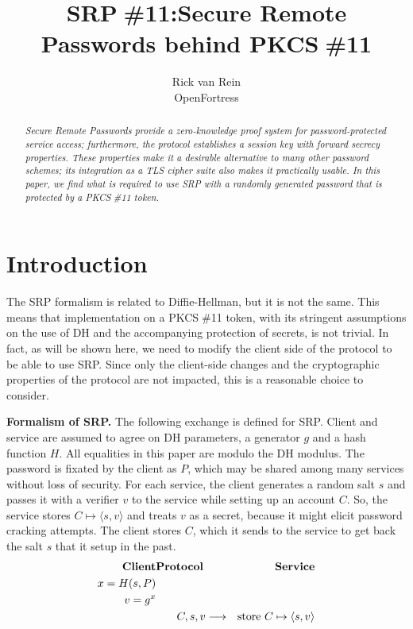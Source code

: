 \documentclass[a4paper,11pt]{article}
\def\pkcs11{PKCS$\;$\#11\xspace}
\def\srp11{SRP$\;$\#11\xspace}
\def\tor#1{\phantom{\longleftarrow\strut}#1\strut\longrightarrow}
\begin{document}
\title{\srp11:\break Secure Remote Passwords behind \pkcs11}
\author{Rick van Rein\\OpenFortress}
\maketitle

\begin{abstract}
\noindent\em Secure Remote Passwords provide a zero-knowledge proof system for password-protected service access; furthermore, the protocol establishes a session key with forward secrecy properties.  These properties make it a desirable alternative to many other password schemes; its integration as a TLS cipher suite also makes it practically usable.
In this paper, we find what is required to use SRP with a randomly generated password that is protected by a \pkcs11 token.
\end{abstract}

\section{Introduction}

The SRP formalism is related to Diffie-Hellman, but it is not the same.  This means that implementation on a \pkcs11 token, with its stringent assumptions on the use of DH and the accompanying protection of secrets, is not trivial.  In fact, as will be shown here, we need to modify the client side of the protocol to be able to use SRP.  Since only the client-side changes and the cryptographic properties of the protocol are not impacted, this is a reasonable choice to consider.

\textbf{Formalism of SRP.}
The following exchange is defined for SRP.  Client and service are assumed to agree on DH parameters,  a generator $g$ and a hash function $H$.  All equalities in this paper are modulo the DH modulus.  The password is fixated by the client as $P$, which may be shared among many services without loss of security.  For each service, the client generates a random salt $s$ and passes it with a verifier $v$ to the service while setting up an account $C$.  So, the service stores $C\mapsto\langle s,v\rangle$ and treats $v$ as a secret, because it might elicit password cracking attempts.  The client stores $C$, which it sends to the service to get back the salt $s$ that it setup in the past.
%
\begin{eqnarray*}
\textbf{Client}&\textbf{Protocol}&\textbf{Service}\\
x=H(s,P)&&\\
v=g^x&&\\
&\tor{C,s,v}&\textrm{store $C\mapsto\langle s,v\rangle$}
\end{eqnarray*}
\end{document}
